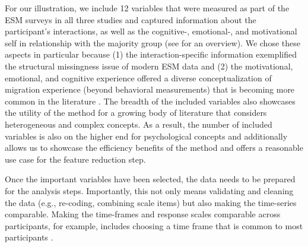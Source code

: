 For our illustration, we include 12 variables that were measured as part
of the ESM surveys in all three studies and captured information about
the participant's interactions, as well as the cognitive-, emotional-,
and motivational self in relationship with the majority group (see
 for an overview). We chose these aspects in
particular because (1) the interaction-specific information exemplified
the structural missingness issue of modern ESM data and (2) the
motivational, emotional, and cognitive experience offered a diverse
conceptualization of migration experience (beyond behavioral
measurements) that is becoming more common in the literature
\citep[][]{Kreienkamp2022d}. The breadth of the included variables also
showcases the utility of the method for a growing body of literature
that considers heterogeneous and complex concepts. As a result, the
number of included variables is also on the higher end for psychological
concepts and additionally allows us to showcase the efficiency benefits
of the method and offers a reasonable use case for the feature reduction
step.



Once the important variables have been selected, the data needs to be
prepared for the analysis steps. Importantly, this not only means
validating and cleaning the data (e.g., re-coding, combining scale
items) but also making the time-series comparable. Making the
time-frames and response scales comparable across participants, for
example, includes choosing a time frame that is common to most
participants
\citep['data preparation' and 'data cleaning' in ; also see][]{liao2005}.

